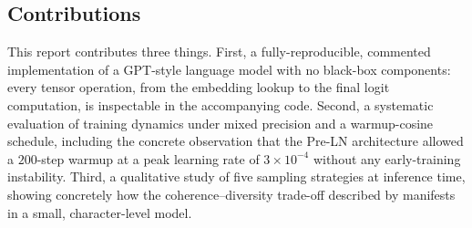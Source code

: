 \subsection{Contributions}
This report contributes three things. First, a fully-reproducible,
commented implementation of a GPT-style language model with no black-box
components: every tensor operation, from the embedding lookup to the final
logit computation, is inspectable in the accompanying code. Second, a
systematic evaluation of training dynamics under mixed precision and a
warmup-cosine schedule, including the concrete observation that the
Pre-LN architecture allowed a $200$-step warmup at a peak learning rate
of $3 \times 10^{-4}$ without any early-training instability. Third, a
qualitative study of five sampling strategies at inference time, showing
concretely how the coherence--diversity trade-off described by
\textcite{holtzman2020curious} manifests in a small, character-level
model.
